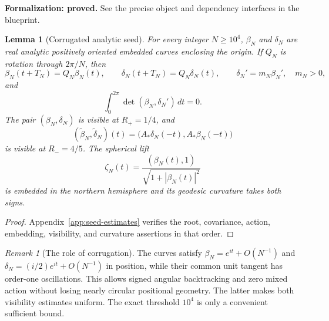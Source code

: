 \documentclass[11pt]{amsart}
\newtheorem{lemma}[theorem]{Lemma}
\theoremstyle{definition}
\theoremstyle{remark}
\newtheorem{remark}[theorem]{Remark}
\numberwithin{equation}{section}
\begin{document}
\par\noindent\textbf{Formalization: proved.} See the precise object and dependency interfaces in the blueprint.\par
\begin{lemma}[Corrugated analytic seed]\label{lem:seed}
For every integer $N\ge10^4$, $\beta_N$ and $\delta_N$ are real analytic
positively oriented embedded curves enclosing the origin. If $Q_N$ is
rotation through $2\pi/N$, then
\begin{equation}\label{eq:seed-data}
 \beta_N(t+T_N)=Q_N\beta_N(t),\qquad
 \delta_N(t+T_N)=Q_N\delta_N(t),\qquad
 \delta_N'=m_N\beta_N',\quad m_N>0,
\end{equation}
and
\begin{equation}\label{eq:zero-action}
 \int_0^{2\pi}\det(\beta_N,\delta_N')\,dt=0.
\end{equation}
The pair $(\beta_N,\delta_N)$ is visible at $R_+=1/4$, and
\[
 (\widetilde\beta_N,\widetilde\delta_N)(t)
 =\bigl(A_*\delta_N(-t),A_*\beta_N(-t)\bigr)
\]
is visible at $R_-=4/5$. The spherical lift
\[
 \zeta_N(t)=\frac{(\beta_N(t),1)}{\sqrt{1+|\beta_N(t)|^2}}
\]
is embedded in the northern hemisphere and its geodesic curvature takes
both signs.
\end{lemma}
\begin{proof}
Appendix~\ref{app:seed-estimates} verifies the root, covariance, action,
embedding, visibility, and curvature assertions in that order.
\end{proof}

\begin{remark}[The role of corrugation]\label{rem:corrugation-mechanism}
The curves satisfy $\beta_N=e^{it}+O(N^{-1})$ and
$\delta_N=(i/2)e^{it}+O(N^{-1})$ in position, while their common unit
tangent has order-one oscillations. This allows signed angular backtracking
and zero mixed action without losing nearly circular positional geometry.
The latter makes both visibility estimates uniform. The exact threshold
$10^4$ is only a convenient sufficient bound.
\end{remark}
\end{document}
